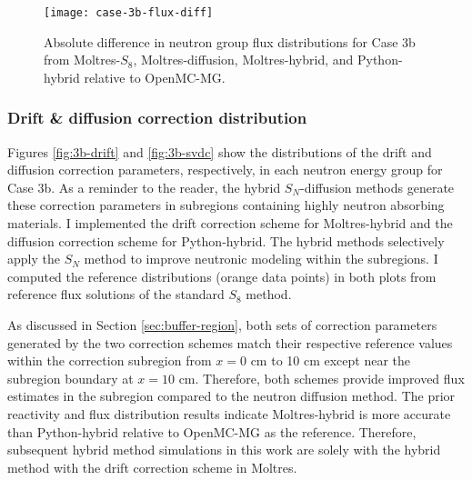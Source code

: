 \begin{figure}[htb!]
  \centering
  \texttt{[image: case-3b-flux-diff]}
  \caption{Absolute difference in neutron group flux distributions for Case 3b from Moltres-$S_8$,
  Moltres-diffusion, Moltres-hybrid, and Python-hybrid relative to OpenMC-MG.}
  \label{fig:3b-flux-diff}
\end{figure}

\FloatBarrier

\subsubsection{Drift \& diffusion correction distribution}

Figures \ref{fig:3b-drift} and \ref{fig:3b-svdc} show the distributions of the drift and diffusion
correction parameters, respectively, in each neutron energy group for Case 3b. As a reminder to the
reader, the hybrid $S_N$-diffusion methods generate these correction parameters in subregions
containing highly neutron absorbing materials. I implemented the drift correction scheme for
Moltres-hybrid and the diffusion correction scheme for Python-hybrid. The hybrid methods
selectively apply the $S_N$ method to improve neutronic modeling within the subregions. I computed
the reference distributions (orange data points) in both plots from reference flux solutions of the
standard $S_8$ method.

As discussed in Section \ref{sec:buffer-region}, both sets of correction parameters generated by
the two correction schemes match their respective reference values within the correction subregion
from $x=0$ cm to 10 cm except near the subregion boundary at $x=10$ cm. Therefore, both schemes
provide improved flux estimates in the subregion compared to the neutron diffusion method.
The prior reactivity and flux distribution results indicate Moltres-hybrid is more accurate
than Python-hybrid relative to OpenMC-MG as the reference. Therefore, subsequent hybrid method
simulations in this work are solely with the hybrid method with the drift correction scheme in
Moltres.

